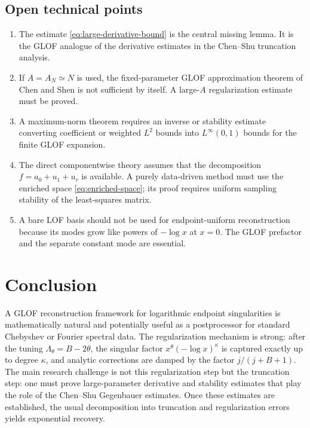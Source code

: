 \documentclass[11pt]{article}
\begin{document}
\subsection*{Open technical points}

\begin{enumerate}[label=(\roman*),leftmargin=2.5em]
\item The estimate \eqref{eq:large-derivative-bound} is the central missing lemma.  It is the GLOF analogue of the derivative estimates in the Chen--Shu truncation analysis.
\item If $A=A_N\simeq N$ is used, the fixed-parameter GLOF approximation theorem of Chen and Shen is not sufficient by itself.  A large-$A$ regularization estimate must be proved.
\item A maximum-norm theorem requires an inverse or stability estimate converting coefficient or weighted $L^2$ bounds into $L^\infty(0,1)$ bounds for the finite GLOF expansion.
\item The direct componentwise theory assumes that the decomposition $f=a_0+u_1+u_r$ is available.  A purely data-driven method must use the enriched space \eqref{eq:enriched-space}; its proof requires uniform sampling stability of the least-squares matrix.
\item A bare LOF basis should not be used for endpoint-uniform reconstruction because its modes grow like powers of $-\log x$ at $x=0$.  The GLOF prefactor and the separate constant mode are essential.
\end{enumerate}

\section{Conclusion}

A GLOF reconstruction framework for logarithmic endpoint singularities is mathematically natural and potentially useful as a postprocessor for standard Chebyshev or Fourier spectral data.  The regularization mechanism is strong: after the tuning $\Lambda_\theta=B-2\theta$, the singular factor $x^\theta(-\log x)^\kappa$ is captured exactly up to degree $\kappa$, and analytic corrections are damped by the factor $j/(j+B+1)$.  The main research challenge is not this regularization step but the truncation step: one must prove large-parameter derivative and stability estimates that play the role of the Chen--Shu Gegenbauer estimates.  Once these estimates are established, the usual decomposition into truncation and regularization errors yields exponential recovery.
\end{document}
